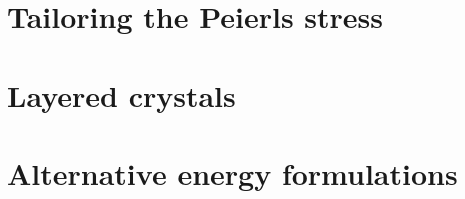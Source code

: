 \section{Tailoring the Peierls stress}
\label{sec:tailor_peierls}




\section{Layered crystals}
\label{sec:layered_crystals}



\section{Alternative energy formulations}

\label{sec:empirical_potentials}


























































































